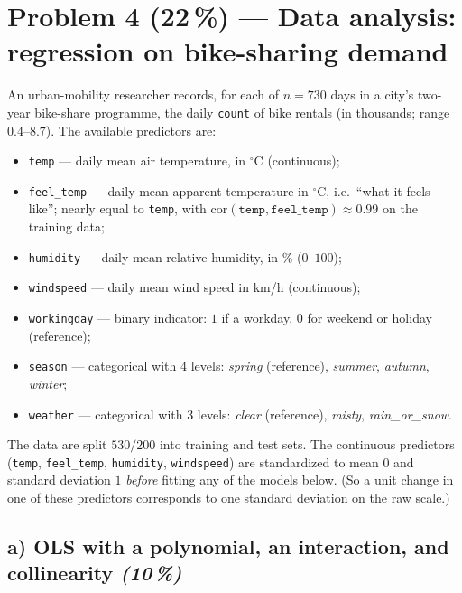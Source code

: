 \documentclass[11pt,a4paper]{article}
\newcommand{\points}[1]{\textbf{(#1\,\%)}}
\newcommand{\subpoints}[1]{\textit{(#1\,\%)}}
\begin{document}
\vfill\eject

\section*{Problem 4 \points{22} --- Data analysis: regression on bike-sharing demand}

An urban-mobility researcher records, for each of $n = 730$ days in a city's two-year bike-share programme, the daily \texttt{count} of bike rentals (in thousands; range $0.4$--$8.7$). The available predictors are:

\begin{itemize}
  \item \texttt{temp} --- daily mean air temperature, in $^\circ$C (continuous);
  \item \texttt{feel\_temp} --- daily mean apparent temperature in $^\circ$C, i.e.\ ``what it feels like''; nearly equal to \texttt{temp}, with $\mathrm{cor}(\texttt{temp}, \texttt{feel\_temp}) \approx 0.99$ on the training data;
  \item \texttt{humidity} --- daily mean relative humidity, in $\%$ ($0$--$100$);
  \item \texttt{windspeed} --- daily mean wind speed in km/h (continuous);
  \item \texttt{workingday} --- binary indicator: $1$ if a workday, $0$ for weekend or holiday (reference);
  \item \texttt{season} --- categorical with $4$ levels: \emph{spring} (reference), \emph{summer}, \emph{autumn}, \emph{winter};
  \item \texttt{weather} --- categorical with $3$ levels: \emph{clear} (reference), \emph{misty}, \emph{rain\_or\_snow}.
\end{itemize}

The data are split $530 / 200$ into training and test sets. The continuous predictors (\texttt{temp}, \texttt{feel\_temp}, \texttt{humidity}, \texttt{windspeed}) are standardized to mean $0$ and standard deviation $1$ \emph{before} fitting any of the models below. (So a unit change in one of these predictors corresponds to one standard deviation on the raw scale.)

\subsection*{a) OLS with a polynomial, an interaction, and collinearity \subpoints{10}}
\end{document}
